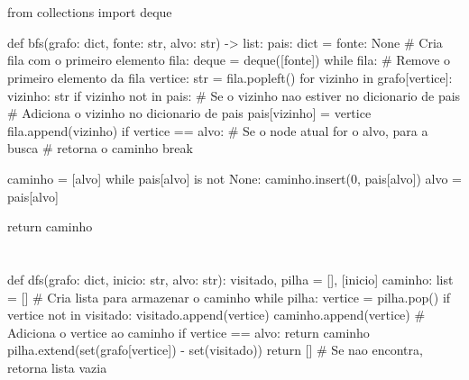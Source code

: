\documentclass{article}
\begin{document}
\section{} %
\begin{python}
from collections import deque

def bfs(grafo: dict, fonte: str, alvo: str) -> list:
    pais: dict = {fonte: None}
    # Cria fila com o primeiro elemento
    fila: deque = deque([fonte])
    while fila:
        # Remove o primeiro elemento da fila
        vertice: str = fila.popleft()
        for vizinho in grafo[vertice]:
            vizinho: str
            if vizinho not in pais:
                # Se o vizinho nao estiver no dicionario de pais
                # Adiciona o vizinho no dicionario de pais
                pais[vizinho] = vertice
                fila.append(vizinho)
                if vertice == alvo:
                    # Se o node atual for o alvo, para a busca
                    # retorna o caminho
                    break

    caminho = [alvo]
    while pais[alvo] is not None:
        caminho.insert(0, pais[alvo])
        alvo = pais[alvo]

    return caminho
\end{python}

\section{} %
\begin{python}
def dfs(grafo: dict, inicio: str, alvo: str):
    visitado, pilha = [], [inicio]
    caminho: list = []  # Cria lista para armazenar o caminho
    while pilha:
        vertice = pilha.pop()
        if vertice not in visitado:
            visitado.append(vertice)
            caminho.append(vertice)  # Adiciona o vertice ao caminho
            if vertice == alvo:
                return caminho
            pilha.extend(set(grafo[vertice]) - set(visitado)) 
    return []  # Se nao encontra, retorna lista vazia
\end{python}
\end{document}
